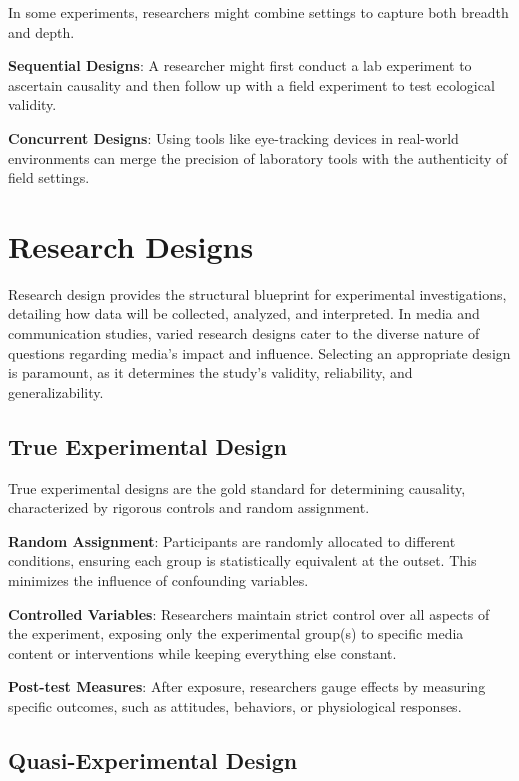 \documentclass[
  b5paper]{book}
\begin{document}
In some experiments, researchers might combine settings to capture both breadth and depth.

\textbf{Sequential Designs}: A researcher might first conduct a lab experiment to ascertain causality and then follow up with a field experiment to test ecological validity.

\textbf{Concurrent Designs}: Using tools like eye-tracking devices in real-world environments can merge the precision of laboratory tools with the authenticity of field settings.

\hypertarget{research-designs}{%
\section{Research Designs}\label{research-designs}}

Research design provides the structural blueprint for experimental investigations, detailing how data will be collected, analyzed, and interpreted. In media and communication studies, varied research designs cater to the diverse nature of questions regarding media's impact and influence. Selecting an appropriate design is paramount, as it determines the study's validity, reliability, and generalizability.

\hypertarget{true-experimental-design}{%
\subsection*{True Experimental Design}\label{true-experimental-design}}

True experimental designs are the gold standard for determining causality, characterized by rigorous controls and random assignment.

\textbf{Random Assignment}: Participants are randomly allocated to different conditions, ensuring each group is statistically equivalent at the outset. This minimizes the influence of confounding variables.

\textbf{Controlled Variables}: Researchers maintain strict control over all aspects of the experiment, exposing only the experimental group(s) to specific media content or interventions while keeping everything else constant.

\textbf{Post-test Measures}: After exposure, researchers gauge effects by measuring specific outcomes, such as attitudes, behaviors, or physiological responses.

\hypertarget{quasi-experimental-design}{%
\subsection*{Quasi-Experimental Design}\label{quasi-experimental-design}}
\end{document}
